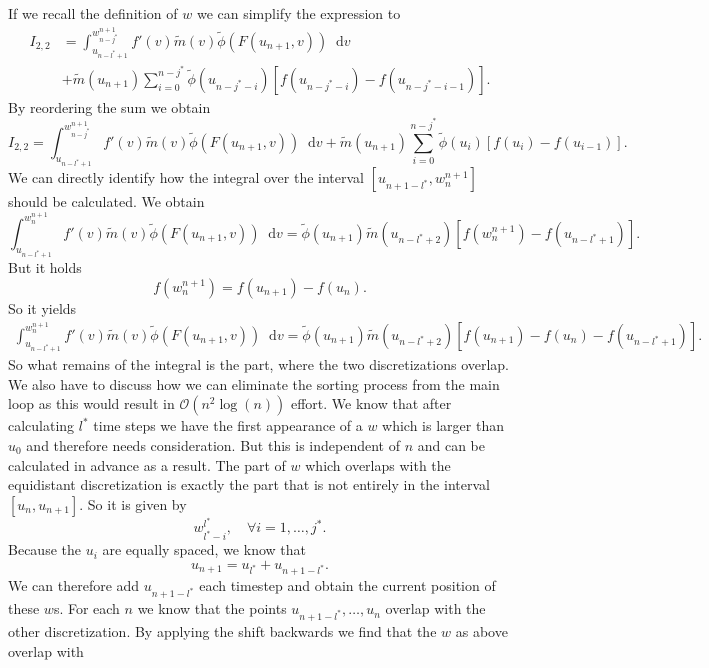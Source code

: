 \documentclass[12pt,a4paper,twoside, open=right]{scrreprt}
\theoremstyle{definition}
\theoremstyle{plain}
\newcommand{\D}{\mathop{}\!\mathrm{d}}
\begin{document}
If we recall the definition of $w$ we can simplify the expression to
\begin{align}
I_{2,2}&=\int_{u_{n-l^*+1}}^{w^{n+1}_{n-j^*}}f'(v)\tilde{m}(v)\tilde{\phi}(F(u_{n+1},v))\D v \\&+\tilde{m}(u_{n+1})\sum_{i=0}^{n-j^*}\tilde\phi(u_{n-j^*-i})[f(u_{n-j^*-i})-f(u_{n-j^*-i-1})].
\end{align}
By reordering the sum we obtain
\begin{equation}
    I_{2,2}=\int_{u_{n-l^*+1}}^{w^{n+1}_{n-j^*}}f'(v)\tilde{m}(v)\tilde{\phi}(F(u_{n+1},v))\D v +
    \tilde{m}(u_{n+1})\sum_{i=0}^{n-j^*}\tilde\phi(u_{i})[f(u_i)-f(u_{i-1})].
\end{equation}
We can directly identify how the integral over the interval $[u_{n+1-l^*},w^{n+1}_{n}]$ should be calculated. We obtain 
\begin{equation}
    \int_{u_{n-l^*+1}}^{w^{n+1}_n}f'(v)\tilde{m}(v)\tilde{\phi}(F(u_{n+1},v))\D v = \tilde\phi(u_{n+1})\tilde{m}(u_{n-l^*+2})[f(w^{n+1}_n)-f(u_{n-l^*+1})].
\end{equation}
But it holds
\begin{equation}
    f(w^{n+1}_n)=f(u_{n+1})-f(u_n).
\end{equation}
So it yields
\begin{align}
     \int_{u_{n-l^*+1}}^{w^{n+1}_n}f'(v)\tilde{m}(v)\tilde{\phi}(F(u_{n+1},v))\D v = \tilde\phi(u_{n+1})\tilde{m}(u_{n-l^*+2})[f(u_{n+1})-f(u_n)-f(u_{n-l^*+1})].
\end{align}
So what remains of the integral is the part, where the two discretizations overlap. We also have to discuss how we can eliminate the sorting process from the main loop as this would result in $\mathcal{O}(n^2\log(n))$ effort. We know that after calculating $l^*$ time steps we have the first appearance of a $w$ which is larger than $u_0$ and therefore needs consideration. But this is independent of $n$ and can be calculated in advance as a result. The part of $w$ which overlaps with the equidistant discretization is exactly the part that is not entirely in the interval $[u_n,u_{n+1}]$. So it is given by
\begin{equation}
    w^{l^*}_{l^*-i},\quad\forall i=1,\dotsc,j^*.
\end{equation}
Because the $u_i$ are equally spaced, we know that
\begin{equation}
    u_{n+1}=u_{l^*}+u_{n+1-l^*}.
\end{equation}
We can therefore add $u_{n+1-l^*}$ each timestep and obtain the current position of these $w$s. For each $n$ we know that the points $u_{n+1-l^*},\dotsc,u_n$ overlap with the other discretization. By applying the shift backwards we find that the $w$ as above overlap with 
\end{document}
